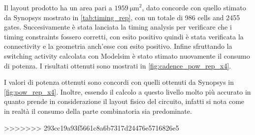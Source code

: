 Il layout prodotto ha un area pari a $\SI{1959}{\micro\meter}^2$, dato concorde con quello stimato da Synopsys mostrato in \autoref{tab:timing_rep}, con un totale di 986 cells and 2455 gates. Succesivamente è stata lanciata la timing analysis per verificare che i timing constraints fossero corretti, con esito positivo quindi è stata verificata la connectivity e la geometria anch'esse con esito positivo. Infine sfruttando la switching activity calcolata con Modelsim è stato stimato nuovamente il consumo di potenza. I risultati ottenuti sono mostrati in \autoref{fig:cadence_pow_rep_x4}.


I valori di potenza ottenuti sono concordi con quelli ottenuti da Synopsys in \autoref{fig:pow_rep_x4}. Inoltre, essendo il calcolo a questo livello molto più accurato in quanto prende in considerazione il layout fisico del circuito, infatti si nota come in realtà il consumo della parte combinatoria sia predominate.

\pagebreak
>>>>>>> 293cc19a93f5661c8a6b7317d24476e5716826e5
